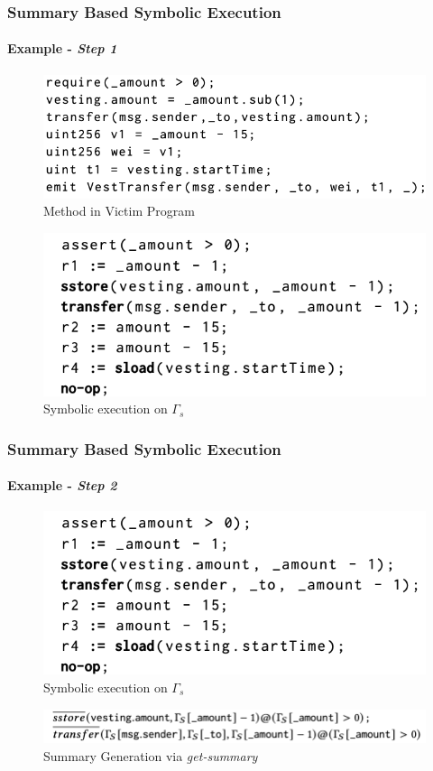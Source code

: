 \documentclass{beamer}
\newcommand{\boldIt}[1]{\textbf{\textit{#1}}}
\begin{document}
\begin{frame}
  \frametitle{Summary Based Symbolic Execution}
  \framesubtitle{Example - \boldIt{Step 1}}
  \begin{figure}
    \centering
  \includegraphics[scale=0.45]{stepOne}
    \caption{Method in Victim Program}
  \end{figure}
  \pause
  \begin{figure}
    \centering
  \includegraphics[scale=0.45]{stepTwo}
    \caption{Symbolic execution on $\Gamma_s$}
  \end{figure}
\end{frame}

\begin{frame}
  \frametitle{Summary Based Symbolic Execution}
  \framesubtitle{Example - \boldIt{Step 2}}
  \begin{figure}
    \centering
  \includegraphics[scale=0.45]{stepTwo}
    \caption{Symbolic execution on $\Gamma_s$}
  \end{figure}
  \pause
  \begin{figure}
    \centering
  \includegraphics[scale=0.45]{stepThree}
    \caption{Summary Generation via \textit{get-summary}}
  \end{figure}
\end{frame}
\end{document}

